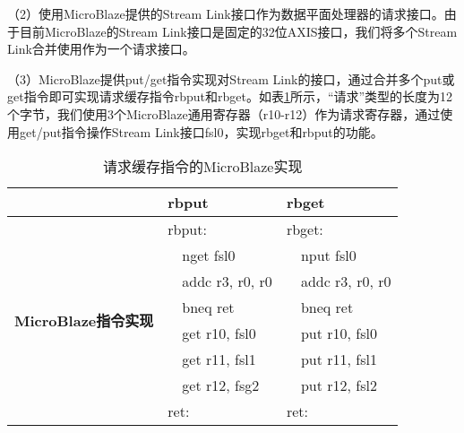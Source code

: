 （2）使用MicroBlaze提供的Stream Link接口作为数据平面处理器的请求接口。由于目前MicroBlaze的Stream Link接口是固定的32位AXIS接口，我们将多个Stream Link合并使用作为一个请求接口。

（3）MicroBlaze提供put/get指令实现对Stream Link的接口，通过合并多个put或get指令即可实现请求缓存指令rbput和rbget。如表\ref{tab:pard-dp-isa-impl}所示，``请求''类型的长度为12个字节，我们使用3个MicroBlaze通用寄存器（r10-r12）作为请求寄存器，通过使用get/put指令操作Stream Link接口fsl0，实现rbget和rbput的功能。

\begin{table}[htb]
  \centering
  \begin{minipage}[t]{0.6\linewidth}
  \caption{请求缓存指令的MicroBlaze实现}
  \label{tab:pard-dp-isa-impl}
    \begin{tabular*}{\linewidth}{lp{0.5cm}lp{0.5cm}l}
      \toprule[1.5pt]
       & \multicolumn{2}{l}{\textbf{rbput}} & \multicolumn{2}{l}{\textbf{rbget}} \\ 
      \midrule[1pt]

      \multirow{8}{2cm}{\textbf{MicroBlaze指令实现}} & \multicolumn{2}{l}{rbput:}   & \multicolumn{2}{l}{rbget:} \\
                                                   &  & nget fsl0                 &  & nput fsl0               \\
                                                   &  & addc r3, r0, r0           &  & addc r3, r0, r0         \\
                                                   &  & bneq ret                  &  & bneq ret                \\
                                                   &  & get r10, fsl0             &  & put r10, fsl0           \\
                                                   &  & get r11, fsl1             &  & put r11, fsl1           \\
                                                   &  & get r12, fsg2             &  & put r12, fsl2           \\
                                                   & \multicolumn{2}{l}{ret:}     & \multicolumn{2}{l}{ret:}   \\
      \bottomrule[1.5pt]
    \end{tabular*}\\[2pt]
  \end{minipage}
\end{table}


